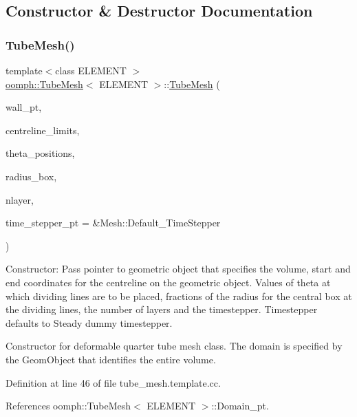 \subsection{Constructor \& Destructor Documentation}
\mbox{\label{classoomph_1_1TubeMesh_a6c2aaa81de6298a3f3a7bf1ae4d2b11d}} 
\subsubsection{\texorpdfstring{Tube\+Mesh()}{TubeMesh()}}
{\footnotesize\ttfamily template$<$class E\+L\+E\+M\+E\+NT $>$ \\
\hyperlink{classoomph_1_1TubeMesh}{oomph\+::\+Tube\+Mesh}$<$ E\+L\+E\+M\+E\+NT $>$\+::\hyperlink{classoomph_1_1TubeMesh}{Tube\+Mesh} (\begin{DoxyParamCaption}\item[{Geom\+Object $\ast$}]{wall\+\_\+pt,  }\item[{const Vector$<$ double $>$ \&}]{centreline\+\_\+limits,  }\item[{const Vector$<$ double $>$ \&}]{theta\+\_\+positions,  }\item[{const Vector$<$ double $>$ \&}]{radius\+\_\+box,  }\item[{const unsigned \&}]{nlayer,  }\item[{Time\+Stepper $\ast$}]{time\+\_\+stepper\+\_\+pt = {\ttfamily \&Mesh\+:\+:Default\+\_\+TimeStepper} }\end{DoxyParamCaption})}



Constructor\+: Pass pointer to geometric object that specifies the volume, start and end coordinates for the centreline on the geometric object. Values of theta at which dividing lines are to be placed, fractions of the radius for the central box at the dividing lines, the number of layers and the timestepper. Timestepper defaults to Steady dummy timestepper. 

Constructor for deformable quarter tube mesh class. The domain is specified by the Geom\+Object that identifies the entire volume. 

Definition at line 46 of file tube\+\_\+mesh.\+template.\+cc.



References oomph\+::\+Tube\+Mesh$<$ E\+L\+E\+M\+E\+N\+T $>$\+::\+Domain\+\_\+pt.

